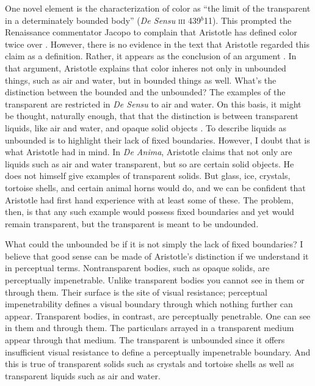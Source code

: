 \documentclass[12pt]{article}
\begin{document}
One novel element is the characterization of color as ``the limit of the transparent in a determinately bounded body'' (\emph{De Sensu} \textsc{iii} 439\( ^{b} \)11). This prompted the Renaissance commentator Jacopo \citet{Zabarella:1605kx} to complain that Aristotle has defined color twice over \citep{Broackes:1999uq}. However, there is no evidence in the text that Aristotle regarded this claim as a definition. Rather, it appears as the conclusion of an argument \citep[65]{Broackes:1999uq}. In that argument, Aristotle explains that color inheres not only in unbounded things, such as air and water, but in bounded things as well. What's the distinction between the bounded and the unbounded? The examples of the transparent are restricted in \emph{De Sensu} to air and water. On this basis, it might be thought, naturally enough, that that the distinction is between transparent liquids, like air and water, and opaque solid objects \citep[59]{Broackes:1999uq}. To describe liquids as unbounded is to highlight their lack of fixed boundaries. However, I doubt that is what Aristotle had in mind. In \emph{De Anima}, Aristotle claims that not only are liquids such as air and water transparent, but so are certain solid objects. He does not himself give examples of transparent solids. But glass, ice, crystals, tortoise shells, and certain animal horns would do, and we can be confident that Aristotle had first hand experience with at least some of these. The problem, then, is that any such example would possess fixed boundaries and yet would remain transparent, but the transparent is meant to be undounded. 

What could the unbounded be if it is not simply the lack of fixed boundaries? I believe that good sense can be made of Aristotle's distinction if we understand it in perceptual terms. Nontransparent bodies, such as opaque solids, are perceptually impenetrable. Unlike transparent bodies you cannot see in them or through them. Their surface is the site of visual resistance; perceptual impenetrability defines a visual boundary through which nothing further can appear. Transparent bodies, in contrast, are perceptually penetrable. One can see in them and through them. The particulars arrayed in a transparent medium appear through that medium. The transparent is unbounded since it offers insufficient visual resistance to define a perceptually impenetrable boundary. And this is true of transparent solids such as crystals and tortoise shells as well as transparent liquids such as air and water.
\end{document}
